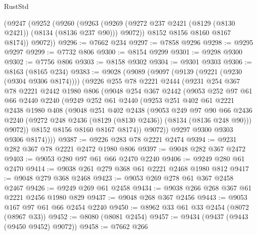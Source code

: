 \begin{lexlean}{RustStd}
\begin{coremodule}
{\begin{coremodule}
{{{{{{{{{{{{{{{{{{{{{{{{{{{{{{{{{{{{{{{{{{{{{{{{{{{{{      (@9247
        (@9252
          (@9260
            (@9263 (@9269 (@9272 @237 @2421 (@8129 (@8130 @2421)) (@8134 (@8136 @237 @90))) @9072))
            @8152
            @8156
            @8160
            @8167
            @8174))
        @9072))
@9296 := @7662 @234
@9297 := @7858 @9296
@9298 := @9295 @9297
@9299 := @7732 @806
@9300 := @8154 @9299
@9301 := @9298 @9300
@9302 := @7756 @806
@9303 := @8158 @9302
@9304 := @9301 @9303
@9306 := @8163 (@8165 @234)
@9383 := @9028
    (@9089
      (@9097
        (@9139 (@9221 (@9230 (@9304 @9306 @8174))))
        (@9226
          @255
          @78
          @2221
          @2444
          (@9231
            @254
            @367
            @78
            @2221
            @2442
            @1980
            @806
            (@9048
              @254
              @367
              @2442
              (@9053
                @252
                @97
                @61
                @66
                @2440
                @2240
                (@9249
                  @252
                  @61
                  @2440
                  (@9253
                    @251
                    @402
                    @61
                    @2221
                    @2438
                    @1980
                    @408
                    (@9048
                      @251
                      @402
                      @2438
                      (@9053
                        @249
                        @97
                        @90
                        @66
                        @2436
                        @2240
                        (@9272 @248 @2436 (@8129 (@8130 @2436)) (@8134 (@8136 @248 @90)))
                        @9072))
                    @8152
                    @8156
                    @8160
                    @8167
                    @8174))
                @9072))
            @9297
            @9300
            @9303
            @9306
            @8174))))
@9387 := @9226 @283 @78 @2221 @2474
@9394 := @9231 @282 @367 @78 @2221 @2472 @1980 @806
@9397 := @9048 @282 @367 @2472
@9403 := @9053 @280 @97 @61 @66 @2470 @2240
@9406 := @9249 @280 @61 @2470
@9414 := @9038 @261 @279 @368 @61 @2221 @2468 @1980 @812
@9417 := @9048 @279 @368 @2468
@9423 := @9053 @269 @278 @61 @367 @2458 @2467
@9426 := @9249 @269 @61 @2458
@9434 := @9038 @266 @268 @367 @61 @2221 @2456 @1980 @829
@9437 := @9048 @268 @367 @2456
@9443 := @9053 @167 @97 @61 @66 @2454 @2240
@9450 := @8962 @33 @61 @33 @2454 (@8072 (@8967 @33))
@9452 := @8080 (@8081 @2454)
@9457 := @9434 (@9437 (@9443 (@9450 @9452) @9072))
@9458 := @7662 @266
}}}}}}}}}}}}}}}}}}}}}}}}}}}}}}}}}}}}}}}}}}}}}}}}}}}}}
\end{coremodule}}
\end{coremodule}
\end{lexlean}
